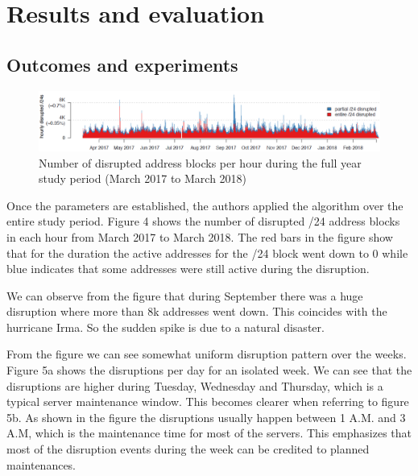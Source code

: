 \documentclass[11pt,twoside,a4paper]{article}
\begin{document}
\section{Results and evaluation} \label{RandEv}
\subsection{Outcomes and experiments}

\begin{figure}[h!] 
\centering
  \includegraphics[width=\linewidth]{Figures/4.png}
  \caption{Number of disrupted address blocks per hour during the full year study period (March 2017 to March 2018)}
  \label{fig:Result}
\end{figure}
Once the parameters are established, the authors applied the algorithm over the entire study period. Figure 4 shows the number of disrupted /24 address blocks in each hour from March 2017 to March 2018. The red bars in the figure show that for the duration the active addresses for the /24 block went down to 0 while blue indicates that some addresses were still active during the disruption.

We can observe from the figure that during September there was a huge disruption where more than 8k addresses went down. This coincides with the hurricane Irma. So the sudden spike is due to a natural disaster.

From the figure we can see somewhat uniform disruption pattern over the weeks. Figure 5a shows the disruptions per day for an isolated week. We can see that the disruptions are higher during Tuesday, Wednesday and Thursday, which is a typical server maintenance window. This becomes clearer when referring to figure 5b. As shown in the figure the disruptions usually happen between 1 A.M. and 3 A.M, which is the maintenance time for most of the servers. This emphasizes that most of the disruption events during the week can be credited to planned maintenances. 
\end{document}
